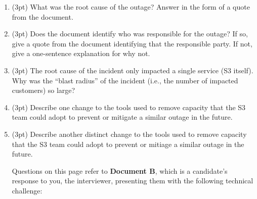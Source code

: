 \documentclass{report}
\newif\ifkey
\newcommand{\answerlong}[1]{\ifkey\color{red}\textbf{#1}\color{black}\else\vspace{0.5in}\fi\xspace}
\newcommand*{\pts}[1]{\addtocounter{points}{#1}(#1pt)}
\begin{document}
\begin{spacing}{1.4}
\begin{enumerate}[leftmargin=*]
    \item \pts{3} What was the root cause of the outage? Answer in the form of a quote
      from the document.\\ \answerlong{``one of the inputs to the command was entered incorrectly''}

    \item \pts{3} Does the document identify who was responsible for the outage? If so, give a quote
      from the document identifying that the responsible party. If not, give a one-sentence explanation
      for why not.\\
      \answerlong{The document does not identify who was responsible, because this is a blameless postmortem:
        it blames the system, rather than the individual. (Any answer with ``blameless'' or a synonym will probably be accepted.)}

    \item \pts{3} The root cause of the incident only impacted a single service (S3 itself). Why was the ``blast radius''
      of the incident (i.e., the number of impacted customers) so large?\\
      \answerlong{Other services relied on S3, so a cascading failure caused them to fail, as well.}
      
    \item \pts{3} Describe one change to the tools used to remove capacity that the S3 team could adopt to prevent or mitigate
      a similar outage in the future. \\
      \answerlong{Either of the following two answers, which S3 itself gives in the full postmortem, is acceptable. Other
        sensible answers may also get credit or partial credit. 1) modify the tool to remove capacity more slowly, or
        2) add safeguards to prevent capacity from being removed when it will take any subsystem below its minimum required capacity level}

    \item \pts{3} Describe another distinct change to the tools used to remove capacity that the S3 team could adopt to prevent
      or mitiage a similar outage in the future. \\
      \answerlong{See the previous question.}
      
    \newpage

    Questions on this page refer to \textbf{Document B}, which is a candidate's response to you,
    the interviewer, presenting them with the following technical challenge:


\end{enumerate}
\end{spacing}
\end{document}
